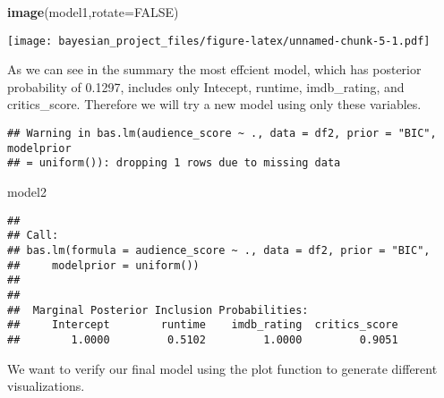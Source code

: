 \documentclass[]{article}
\newenvironment{Shaded}{\begin{snugshade}}{\end{snugshade}}
\newcommand{\KeywordTok}[1]{\textcolor[rgb]{0.13,0.29,0.53}{\textbf{#1}}}
\newcommand{\DataTypeTok}[1]{\textcolor[rgb]{0.13,0.29,0.53}{#1}}
\newcommand{\StringTok}[1]{\textcolor[rgb]{0.31,0.60,0.02}{#1}}
\newcommand{\OtherTok}[1]{\textcolor[rgb]{0.56,0.35,0.01}{#1}}
\newcommand{\OperatorTok}[1]{\textcolor[rgb]{0.81,0.36,0.00}{\textbf{#1}}}
\newcommand{\NormalTok}[1]{#1}
\begin{document}
\begin{Shaded}
\begin{Highlighting}[]
\KeywordTok{image}\NormalTok{(model1,}\DataTypeTok{rotate=}\OtherTok{FALSE}\NormalTok{)}
\end{Highlighting}
\end{Shaded}

\texttt{[image: bayesian\_project\_files/figure-latex/unnamed-chunk-5-1.pdf]}

As we can see in the summary the most effcient model, which has
posterior probability of 0.1297, includes only Intecept, runtime,
imdb\_rating, and critics\_score. Therefore we will try a new model
using only these variables.

\begin{Shaded}
\end{Shaded}

\begin{verbatim}
## Warning in bas.lm(audience_score ~ ., data = df2, prior = "BIC", modelprior
## = uniform()): dropping 1 rows due to missing data
\end{verbatim}

\begin{Shaded}
\begin{Highlighting}[]
\NormalTok{model2}
\end{Highlighting}
\end{Shaded}

\begin{verbatim}
## 
## Call:
## bas.lm(formula = audience_score ~ ., data = df2, prior = "BIC", 
##     modelprior = uniform())
## 
## 
##  Marginal Posterior Inclusion Probabilities: 
##     Intercept        runtime    imdb_rating  critics_score  
##        1.0000         0.5102         1.0000         0.9051
\end{verbatim}

We want to verify our final model using the plot function to generate
different visualizations.
\end{document}
